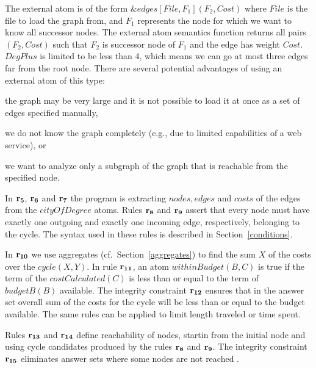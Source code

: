 \documentclass[a4paper, titlepage]{article}
\newcommand{\mi}[1]{\mathit{#1}}
\newcommand{\ext}[3]{\ensuremath{\&{\mathit{#1}}[#2](#3)}}
\newcommand{\row}[1]{%
  \ensuremath{\color{black}\ensuremath{\mathbf{#1}} \color{black}}%
}
\begin{document}
The external atom is of 
the form $\ext{edges}{File,F_1}{F_2,Cost}$
where $\mi{File}$ is the file to load the graph from,
and $\mathit{F_1}$ represents the node
for which we want to know all successor nodes.
The external atom semantics function
returns all pairs $(F_2,\mi{Cost})$
such that $F_2$ is successor node of $F_1$
and the edge has weight $\mathit{Cost}$.
$\mathit{DegPlus}$ is limited to be less than 4,
which means we can go at most three edges far from the root node. 
%
There are several potential advantages
of using an external atom of this type:%
\begin{inparaenum}[(i)]
\item
  the graph may be very large and it is not possible to load it 
  at once as a set of edges specified manually,
\item
  we do not know the graph completely
  (e.g., due to limited capabilities of a web service), or
\item
  we want to analyze only a subgraph of the graph that is 
  reachable from the specified node.
\end{inparaenum}

In $\row{r_5}$, $\row{r_6}$ and $\row{r_7}$ the program is extracting 
$\mathit{nodes}, \mathit{edges}$ and $\mathit{costs}$ of 
the edges from the $\mathit{cityOfDegree}$ atoms. 
%
Rules $\row{r_8}$ and $\row{r_9}$ assert that every 
node must have exactly one outgoing and exactly one 
incoming edge, respectively, belonging to the cycle.
The syntax used in these rules is described in Section~\ref{conditions}.

In $\row{r_{10}}$ we use aggregates (cf.\ Section~\ref{aggregates})
to find the sum $X$ of the costs over the 
$\mathit{cycle(X,Y)}$. In rule $\row{r_{11}}$, an atom 
$\mathit{withinBudget(B,C)}$ is true if the term of the 
$\mathit{costCalculated(C)}$ is less than or equal to the 
term of $\mathit{budgetB(B)}$ available.
The integrity constraint $\row{r_{12}}$ ensures that in the answer 
set overall sum of the costs for the cycle will be less 
than or equal to the budget available.
The same rules can be applied to limit length traveled or time spent.

Rules $\row{r_{13}}$ and $\row{r_{14}}$
define reachability of nodes, startin from the initial node
and using cycle candidates produced by the rules 
$\row{r_8}$ and $\row{r_9}$.
%
The integrity constraint $\row{r_{15}}$ 
eliminates answer sets where some nodes are not reached
\cite{gkklorst2015}.
\end{document}
